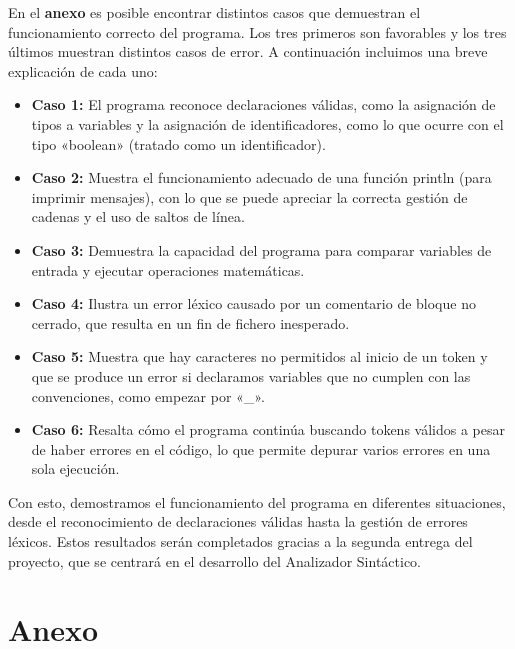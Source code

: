 \documentclass{article}
\begin{document}
En el \textbf{anexo} es posible encontrar distintos casos que demuestran el funcionamiento correcto del programa. Los tres primeros son favorables y los tres últimos muestran distintos casos de error. A continuación incluimos una breve explicación de cada uno:

\begin{itemize}
    \item \textbf{Caso 1:} El programa reconoce declaraciones válidas, como la asignación de tipos a variables y la asignación de identificadores, como lo que ocurre con el tipo «boolean» (tratado como un identificador).
    
    \item \textbf{Caso 2:} Muestra el funcionamiento adecuado de una función println (para imprimir mensajes), con lo que se puede apreciar la correcta gestión de cadenas y el uso de saltos de línea.
    
    \item \textbf{Caso 3:} Demuestra la capacidad del programa para comparar variables de entrada y ejecutar operaciones matemáticas.
    
    \item \textbf{Caso 4:} Ilustra un error léxico causado por un comentario de bloque no cerrado, que resulta en un fin de fichero inesperado.
    
    \item \textbf{Caso 5:} Muestra que hay caracteres no permitidos al inicio de un token y que se produce un error si declaramos variables que no cumplen con las convenciones, como empezar por «\_».
    
    \item \textbf{Caso 6:} Resalta cómo el programa continúa buscando tokens válidos a pesar de haber errores en el código, lo que permite depurar varios errores en una sola ejecución.
\end{itemize}

Con esto, demostramos el funcionamiento del programa en diferentes situaciones, desde el reconocimiento de declaraciones válidas hasta la gestión de errores léxicos. Estos resultados serán completados gracias a la segunda entrega del proyecto, que se centrará en el desarrollo del Analizador Sintáctico.

\newpage

\appendix
\section*{Anexo}
\end{document}
